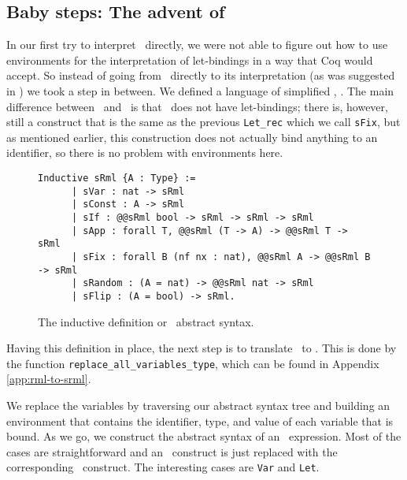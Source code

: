 \documentclass[11pt, leqno, titlepage]{article}
\def\coqe{\lstinline[language=Coq, basicstyle=\small]}
\theoremstyle{definition}
\begin{document}
\subsection{Baby steps: The advent of \srml}
\label{sec:srml}
In our first try to interpret \rml\ directly, we were not able to figure out how to
use environments for the interpretation of let-bindings in a way that Coq would
accept. So instead of going from \rml\ directly to its interpretation (as was
suggested in \cite{rml-paper})
we took a step in between. We defined a language of simplified \rml, \srml. The main
difference between \rml\ and \srml\ is that \srml\ does not have let-bindings; there is,
however, still a construct that is the same as the previous \coqe{Let_rec} which we
call \coqe{sFix}, but as mentioned earlier, this construction does not actually bind
anything to an identifier, so there is no problem with environments here.

\begin{figure}[h]
  \centering
  \begin{minipage}{0.8\linewidth}
    \begin{lstlisting}[language=coq]
      Inductive sRml {A : Type} :=
      | sVar : nat -> sRml
      | sConst : A -> sRml
      | sIf : @@sRml bool -> sRml -> sRml -> sRml
      | sApp : forall T, @@sRml (T -> A) -> @@sRml T -> sRml
      | sFix : forall B (nf nx : nat), @@sRml A -> @@sRml B -> sRml
      | sRandom : (A = nat) -> @@sRml nat -> sRml
      | sFlip : (A = bool) -> sRml.
    \end{lstlisting}
  \caption{The inductive definition or \srml\ abstract syntax.}
  \end{minipage}
\end{figure}

Having this definition in place, the next step is to translate \rmlx\ to \srml. This
is done by the function \coqe{replace_all_variables_type}, which can be found in
Appendix \ref{app:rml-to-srml}. 

We replace the variables by traversing our abstract syntax tree and building an
environment that contains the identifier, type, and value of each variable that is
bound. As we go, we construct the abstract syntax of an \srml\ expression. Most of
the cases are straightforward and an \rmlx\ construct is just replaced with the
corresponding \srml\ construct. The interesting cases are \coqe{Var} and
\coqe{Let}.
\end{document}
